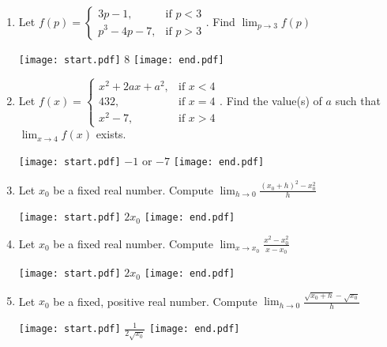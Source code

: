 \documentclass[12pt]{article}
\begin{document}
\begin{enumerate}
\item Let $\displaystyle f(p) = \begin{cases} 
        3p-1, & \text{if } p<3 \\
        p^3-4p-7, & \text{if } p>3 \end{cases}$. Find $\displaystyle \lim_{p\rightarrow 3}{f(p)}$

\texttt{[image: start.pdf]}
{{8}}
\texttt{[image: end.pdf]}


\item Let $f(x) = \begin{cases}
        x^2+2ax+a^2, & \text{if } x < 4 \\
        432, & \text{if } x = 4 \\
        x^2 -7, & \text{if } x > 4 \end{cases}$. Find the value(s) of $a$ such that $\displaystyle \lim_{x\rightarrow 4}{f(x)}$ exists. 

\texttt{[image: start.pdf]}
{{$-1$ or $-7$}}
\texttt{[image: end.pdf]}


\item Let $x_0$ be a fixed real number.  Compute $\displaystyle \lim_{h \rightarrow 0}{\frac{(x_0+h)^2-x_0^2}{h}}$

\texttt{[image: start.pdf]}
{{$2x_0$}}
\texttt{[image: end.pdf]}


\item Let $x_0$ be a fixed real number.  Compute $\displaystyle \lim_{x \rightarrow x_0}{\frac{x^2-x_0^2}{x-x_0}}$

\texttt{[image: start.pdf]}
{{$2x_0$}}
\texttt{[image: end.pdf]}


\item Let $x_0$ be a fixed, positive real number.  Compute $\displaystyle \lim_{h \rightarrow 0}{\frac{\sqrt{x_0+h}-\sqrt{x_0}}{h}}$

\texttt{[image: start.pdf]}
{{$\displaystyle \frac{1}{2\sqrt{x_0}}$}}
\texttt{[image: end.pdf]}


\end{enumerate}
\end{document}
